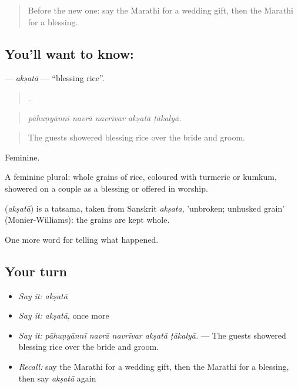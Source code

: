 \label{lesson:MR-C317-aksata}



\begin{quote}
Before the new one: say the Marathi for a wedding gift, then the Marathi for a blessing.
\end{quote}

\subsection*{You'll want to know: }
\textbf{} — \emph{akṣatā} — \textquotedblleft{}blessing rice\textquotedblright{}.

\begin{quote}
    .
\end{quote}

\begin{quote}
\emph{pāhuṇyānnī navrā navrīvar akṣatā ṭākalyā.}
\end{quote}

\begin{quote}
The guests showered blessing rice over the bride and groom.
\end{quote}

Feminine.

A feminine plural: whole grains of rice, coloured with turmeric or kumkum, showered on a couple as a blessing or offered in worship.

\begin{cousinweb}
\textbf{} (\emph{akṣatā}) is a tatsama, taken from Sanskrit \emph{akṣata}, 'unbroken; unhusked grain' (Monier-Williams): the grains are kept whole.
\end{cousinweb}

\begin{grammarlens}[title={What you've built}]
One more word for telling what happened.
\end{grammarlens}

\subsection*{Your turn}
\begin{itemize}
\raggedright
  \item \emph{Say it:} \emph{akṣatā}
  \item \emph{Say it:} \emph{akṣatā}, once more
  \item \emph{Say it:} \emph{pāhuṇyānnī navrā navrīvar akṣatā ṭākalyā.} — The guests showered blessing rice over the bride and groom.
  \item \emph{Recall:} say the Marathi for a wedding gift, then the Marathi for a blessing, then say \emph{akṣatā} again
\end{itemize}

